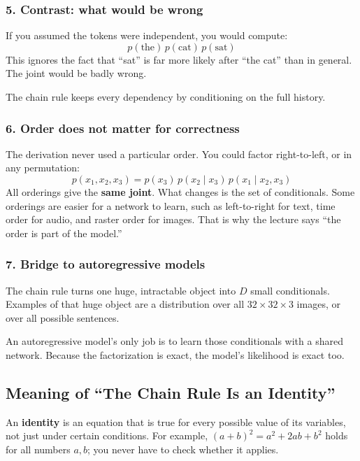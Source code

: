\subsubsection*{5. Contrast: what would be wrong}

If you assumed the tokens were independent, you would compute:
\[
p(\text{the})\, p(\text{cat})\, p(\text{sat})
\]
This ignores the fact that ``sat'' is far more likely after ``the cat'' than in general. The joint would be badly wrong.

The chain rule keeps every dependency by conditioning on the full history.

\subsubsection*{6. Order does not matter for correctness}

The derivation never used a particular order. You could factor right-to-left, or in any permutation:
\[
p(x_1, x_2, x_3) = p(x_3)\, p(x_2 \mid x_3)\, p(x_1 \mid x_2, x_3)
\]
All orderings give the \textbf{same joint}. What changes is the set of conditionals. Some orderings are easier for a network to learn, such as left-to-right for text, time order for audio, and raster order for images. That is why the lecture says ``the order is part of the model.''

\subsubsection*{7. Bridge to autoregressive models}

The chain rule turns one huge, intractable object into $D$ small conditionals. Examples of that huge object are a distribution over all $32 \times 32 \times 3$ images, or over all possible sentences.

An autoregressive model's only job is to learn those conditionals with a shared network. Because the factorization is exact, the model's likelihood is exact too.

\subsection*{Meaning of ``The Chain Rule Is an Identity''}

An \textbf{identity} is an equation that is true for every possible value of its variables, not just under certain conditions. For example, $(a+b)^2 = a^2 + 2ab + b^2$ holds for all numbers $a, b$; you never have to check whether it applies.

